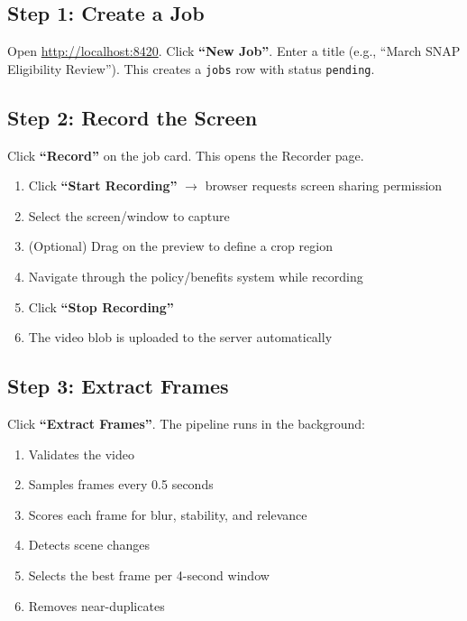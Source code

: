 \documentclass[12pt, a4paper]{article}
\newcommand{\codeinline}[1]{\texttt{\small\colorbox{codebg}{#1}}}
\begin{document}
\subsection{Step 1: Create a Job}

Open \url{http://localhost:8420}. Click \textbf{``New Job''}. Enter a title (e.g., ``March SNAP Eligibility Review''). This creates a \codeinline{jobs} row with status \codeinline{pending}.

\subsection{Step 2: Record the Screen}

Click \textbf{``Record''} on the job card. This opens the Recorder page.

\begin{enumerate}
    \item Click \textbf{``Start Recording''} $\rightarrow$ browser requests screen sharing permission
    \item Select the screen/window to capture
    \item (Optional) Drag on the preview to define a crop region
    \item Navigate through the policy/benefits system while recording
    \item Click \textbf{``Stop Recording''}
    \item The video blob is uploaded to the server automatically
\end{enumerate}

\subsection{Step 3: Extract Frames}

Click \textbf{``Extract Frames''}. The pipeline runs in the background:

\begin{enumerate}
    \item Validates the video
    \item Samples frames every 0.5 seconds
    \item Scores each frame for blur, stability, and relevance
    \item Detects scene changes
    \item Selects the best frame per 4-second window
    \item Removes near-duplicates
\end{enumerate}
\end{document}
